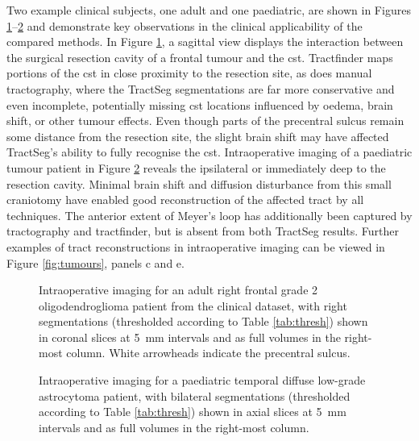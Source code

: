 Two example clinical subjects, one adult and one paediatric, are shown in Figures \ref{fig:lb.nh}--\ref{fig:lb.gosh} and demonstrate key observations in the clinical applicability of the compared methods.
In Figure \ref{fig:lb.nh}, a sagittal view displays the interaction between the surgical resection cavity of a frontal tumour and the \gls{cst}.
Tractfinder maps portions of the \gls{cst} in close proximity to the resection site, as does manual tractography, where the TractSeg segmentations are far more conservative and even incomplete, potentially missing \gls{cst} locations influenced by oedema, brain shift, or other tumour effects.
Even though parts of the precentral sulcus remain some distance from the resection site, the slight brain shift may have affected TractSeg's ability to fully recognise the \gls{cst}.
Intraoperative imaging of a paediatric tumour patient in Figure \ref{fig:lb.gosh} reveals the ipsilateral \gls{or} immediately deep to the resection cavity.
Minimal brain shift and diffusion disturbance from this small craniotomy have enabled good reconstruction of the affected tract by all techniques.
The anterior extent of Meyer's loop has additionally been captured by tractography and tractfinder, but is absent from both TractSeg results.
Further examples of tract reconstructions in intraoperative imaging can be viewed in Figure \ref{fig:tumours}, panels c and e.

\begin{figure}[htb!]
  \makebox[\linewidth][r]{%
  }
  \caption[CST segmentations in all benchmark evaluation methods for an adult intraoperative case in the clinical dataset]{Intraoperative imaging for an adult right frontal  grade 2 oligodendroglioma patient from the clinical dataset, with right  segmentations (thresholded according to Table \ref{tab:thresh}) shown in coronal slices at 5~mm intervals and as full volumes in the right-most column. White arrowheads indicate the precentral sulcus.}
  \label{fig:lb.nh}
\end{figure}
\begin{figure}[htb!]
  \makebox[\linewidth][r]{%
  }
  \caption[OR segmentations in all benchmark evaluation methods for a paediatric intraoperative case in the clinical dataset]{Intraoperative imaging for a paediatric temporal diffuse low-grade astrocytoma patient, with bilateral  segmentations (thresholded according to Table \ref{tab:thresh}) shown in axial slices at 5~mm intervals and as full volumes in the right-most column.}
  \label{fig:lb.gosh}
\end{figure}

